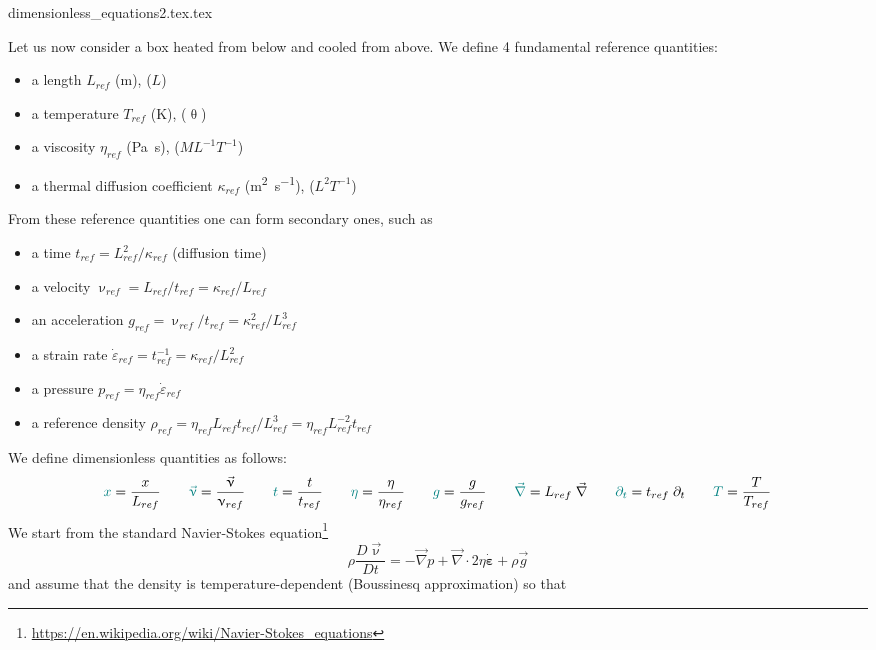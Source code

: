 \begin{flushright} {\tiny {\color{gray} dimensionless\_equations2.tex.tex}} \end{flushright}

Let us now consider a box heated from below and cooled from above. 
We define 4 fundamental reference quantities:
\begin{itemize}
\item a length $L_{ref}$ (\si{\metre}), ($L$)
\item a temperature $T_{ref}$ (\si{\kelvin}), ($\uptheta$)
\item a viscosity $\eta_{ref}$ (\si{\pascal\second}), ($ML^{-1}T^{-1}$)
\item a thermal diffusion coefficient $\kappa_{ref}$ (\si{\square\metre\per\second}), ($L^2T^{-1}$)
\end{itemize}
From these reference quantities one can form secondary ones, such as
\begin{itemize}
\item a time $t_{ref} = L_{ref}^2 / \kappa_{ref}$ (diffusion time)
\item a velocity $\upnu_{ref} = L_{ref} / t_{ref} = \kappa_{ref}/L_{ref}$
\item an acceleration $g_{ref} = \upnu_{ref} / t_{ref} = \kappa_{ref}^2/L_{ref}^3$
\item a strain rate $\dot{\varepsilon}_{ref} = t_{ref}^{-1} = \kappa_{ref} / L_{ref}^2$
\item a pressure $p_{ref} = \eta_{ref} \dot{\varepsilon}_{ref} $
\item a reference density $\rho_{ref} = \eta_{ref} L_{ref} t_{ref}/L_{ref}^3 = \eta_{ref} L_{ref}^{-2} t_{ref}$
\end{itemize}
We define {\color{teal}dimensionless} quantities as follows:
\[
{\color{teal}x} = \frac{x}{L_{ref}}
\qquad
{\color{teal}\vec\upnu} = \frac{\vec\upnu}{\upnu_{ref}}
\qquad
{\color{teal}t} = \frac{t}{t_{ref}}
\qquad
{\color{teal} \eta} = \frac{\eta}{\eta_{ref}}
\qquad
{\color{teal} g} =\frac{g}{g_{ref}}
\qquad
{\color{teal} \vec\nabla} = L_{ref}\; \vec\nabla
\qquad
{\color{teal} \partial_t} = t_{ref}\; \partial_t 
\qquad
{\color{teal} T} = \frac{T}{T_{ref}}
\]
We start from the standard Navier-Stokes equation\footnote{\url{https://en.wikipedia.org/wiki/Navier-Stokes_equations}}
\[
\rho \frac{D \vec\upnu}{D t}
=
-\vec\nabla p + \vec\nabla \cdot 2 \eta \dot{\bm\varepsilon}
+ \rho \vec{g} 
\]
and assume that the density is temperature-dependent (Boussinesq approximation) so that
